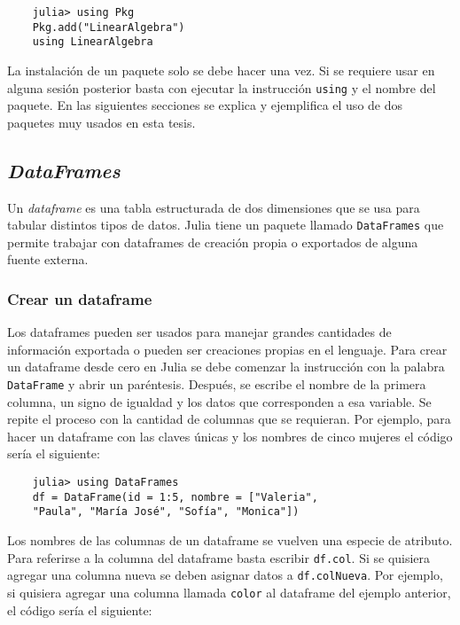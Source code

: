 \begin{verbatim}
	julia> using Pkg
	Pkg.add("LinearAlgebra")
	using LinearAlgebra
\end{verbatim}

La instalación de un paquete solo se debe hacer una vez. Si se requiere usar en alguna sesión posterior basta con ejecutar la instrucción \texttt{using} y el nombre del paquete. En las siguientes secciones se explica y ejemplifica el uso de dos paquetes muy usados en esta tesis. 

\subsection{\textit{DataFrames}}

Un \textit{dataframe} es una tabla estructurada de dos dimensiones que se usa para tabular distintos tipos de datos. \textsf{Julia} tiene un paquete llamado \texttt{DataFrames} \citep{software_dataframes} que permite trabajar con dataframes de creación propia o exportados de alguna fuente externa. 

\subsubsection{Crear un dataframe}

Los dataframes pueden ser usados para manejar grandes cantidades de información exportada o pueden ser creaciones propias en el lenguaje. Para crear un dataframe desde cero en \textsf{Julia} se debe comenzar la instrucción con la palabra \texttt{DataFrame} y abrir un paréntesis. Después, se escribe el nombre de la primera columna, un signo de igualdad y los datos que corresponden a esa variable. Se repite el proceso con la cantidad de columnas que se requieran. Por ejemplo, para hacer un dataframe con las claves únicas y los nombres de cinco mujeres el código sería el siguiente: 


\begin{verbatim}
	julia> using DataFrames
	df = DataFrame(id = 1:5, nombre = ["Valeria", 
	"Paula", "María José", "Sofía", "Monica"])
\end{verbatim}

Los nombres de las columnas de un dataframe se vuelven una especie de atributo. Para referirse a la columna  del dataframe  basta escribir \texttt{df.col}. Si se quisiera agregar una columna nueva se deben asignar datos a \texttt{df.colNueva}. Por ejemplo, si quisiera agregar una columna llamada \texttt{color} al dataframe del ejemplo anterior, el código sería el siguiente: 

